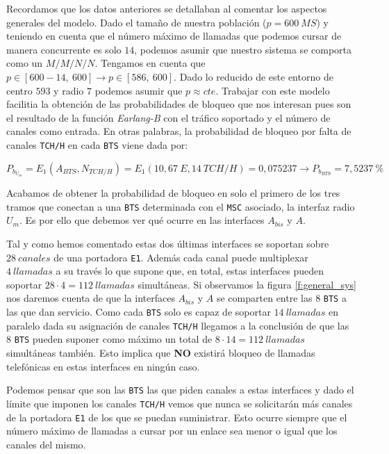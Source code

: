 \documentclass[10pt]{article}
\begin{document}
			Recordamos que los datos anteriores se detallaban al comentar los aspectos generales del modelo. Dado el tamaño de nuestra población ($p = 600\ MS$) y teniendo en cuenta que el número máximo de llamadas que podemos cursar de manera concurrente es solo $14$, podemos asumir que nuestro sistema se comporta como un $M/M/N/N$. Tengamos en cuenta que $p \in [600 - 14,\ 600] \rightarrow p \in [586,\ 600]$. Dado lo reducido de este entorno de centro $593$ y radio $7$ podemos asumir que $p \approx cte$. Trabajar con este modelo facilitia la obtención de las probabilidades de bloqueo que nos interesan pues son el resultado de la función \textit{Earlang-B} con el tráfico soportado y el número de canales como entrada. En otras palabras, la probabilidad de bloqueo por falta de canales \texttt{TCH/H} en cada \texttt{BTS} viene dada por:

			$$P_{b_{U_m}} = E_1(A_{BTS}, N_{TCH/H}) = E_1(10,67\ E, 14\ TCH/H) = 0,075237 \rightarrow P_{b_{BTS}} = 7,5237\ \%$$

			Acabamos de obtener la probabilidad de bloqueo en solo el primero de los tres tramos que conectan a una \texttt{BTS} determinada con el \texttt{MSC} asociado, la interfaz radio $U_m$. Es por ello que debemos ver qué ocurre en las interfaces $A_{bis}$ y $A$.

			Tal y como hemos comentado estas dos últimas interfaces se soportan sobre $28\ canales$ de una portadora \texttt{E1}. Además cada canal puede multiplexar $4\ llamadas$ a su través lo que supone que, en total, estas interfaces pueden soportar $28 \cdot 4 = 112\ llamadas$ simultáneas. Si observamos la figura \ref{f:general_sys} nos daremos cuenta de que la interfaces $A_{bis}$ y $A$ se comparten entre las $8$ \texttt{BTS} a las que dan servicio. Como cada \texttt{BTS} solo es capaz de soportar $14\ llamadas$ en paralelo dada su asignación de canales \texttt{TCH/H} llegamos a la conclusión de que las $8$ \texttt{BTS} pueden suponer como máximo un total de $8 \cdot 14 = 112\ llamadas$ simultáneas también. Esto implica que \textbf{NO} existirá bloqueo de llamadas telefónicas en estas interfaces en ningún caso.

			Podemos pensar que son las \texttt{BTS} las que piden canales a estas interfaces y dado el límite que imponen los canales \texttt{TCH/H} vemos que nunca se solicitarán más canales de la portadora \texttt{E1} de los que se puedan suministrar. Esto ocurre siempre que el número máximo de llamadas a cursar por un enlace sea menor o igual que los canales del mismo.
\end{document}
